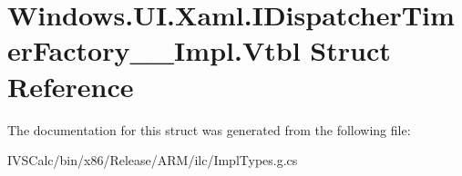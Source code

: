 \hypertarget{struct_windows_1_1_u_i_1_1_xaml_1_1_i_dispatcher_timer_factory_____impl_1_1_vtbl}{}\section{Windows.\+U\+I.\+Xaml.\+I\+Dispatcher\+Timer\+Factory\+\_\+\+\_\+\+Impl.\+Vtbl Struct Reference}
\label{struct_windows_1_1_u_i_1_1_xaml_1_1_i_dispatcher_timer_factory_____impl_1_1_vtbl}


The documentation for this struct was generated from the following file\+:\begin{DoxyCompactItemize}
\item 
I\+V\+S\+Calc/bin/x86/\+Release/\+A\+R\+M/ilc/Impl\+Types.\+g.\+cs\end{DoxyCompactItemize}
